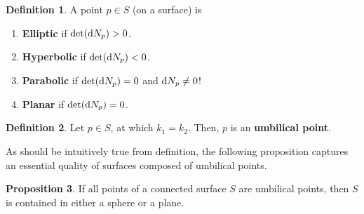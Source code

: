 \documentclass{amsart} %
\theoremstyle{mytheoremstyle}
\theoremstyle{definition}
\newtheorem{definition}{Definition}[section]
\newtheorem{proposition}[definition]{Proposition}
\numberwithin{equation}{section}
\DeclareMathOperator{\1}{\mathbbm{1}}
\DeclareMathOperator{\D}{\dif}
\begin{document}
\begin{definition}
	\label{defehpppoints}
	A point $p \in S$ (on a surface) is 
	\begin{enumerate}
		\item \textbf{Elliptic} if $\det (\D N_p) > 0$.
		\item \textbf{Hyperbolic} if $\det (\D N_p)<0$.
		\item \textbf{Parabolic} if $\det (\D N_p) = 0$ and $\D N_p \neq 0$!
		\item \textbf{Planar} if $\det (\D N_p) = 0$.
	\end{enumerate}
\end{definition}

\begin{definition}
	\label{defumbilicalpoint}
	Let $p \in S$, at which $k_1=k_2$. Then, $p$ is an \textbf{umbilical point}.
\end{definition}

\noindent As should be intuitively true from definition, the following proposition captures an essential quality of surfaces composed of umbilical points.

\begin{proposition}
	\label{propumbilicalpoints}
	If all points of a connected surface $S$ are umbilical points, then $S$ is contained in either a sphere or a plane.
\end{proposition}
\end{document}
